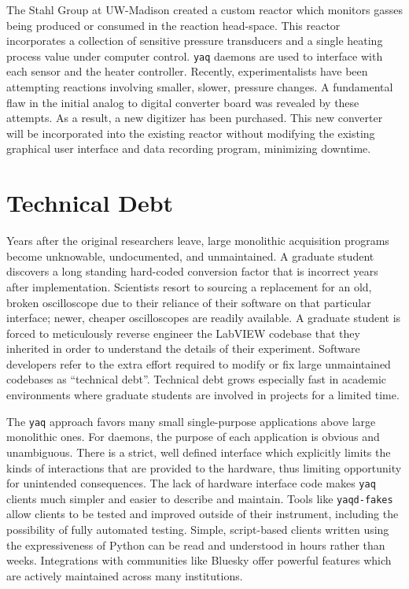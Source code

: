 \documentclass[aip, amsmath, amssymb, reprint,]{revtex4-1}
\newcommand\yaq{\texttt{yaq}}
\begin{document}
The Stahl Group at UW-Madison created a custom reactor which monitors gasses being produced or consumed in the reaction head-space.  \cite{SalazarChaseA2021a}
This reactor incorporates a collection of sensitive pressure transducers and a single heating process value under computer control.
\yaq{} daemons are used to interface with each sensor and the heater controller.
Recently, experimentalists have been attempting reactions involving smaller, slower, pressure changes.
A fundamental flaw in the initial analog to digital converter board was revealed by these attempts.
As a result, a new digitizer has been purchased.
This new converter will be incorporated into the existing reactor without modifying the existing graphical user interface and data recording program, minimizing downtime.


\section{Technical Debt}

Years after the original researchers leave, large monolithic acquisition programs become unknowable, undocumented, and unmaintained.
A graduate student discovers a long standing hard-coded conversion factor that is incorrect years after implementation.
Scientists resort to sourcing a replacement for an old, broken oscilloscope due to their reliance of their software on that particular interface; newer, cheaper oscilloscopes are readily available.
A graduate student is forced to meticulously reverse engineer the LabVIEW codebase that they inherited in order to understand the details of their experiment.
Software developers refer to the extra effort required to modify or fix large unmaintained codebases as ``technical debt''.\cite{}
Technical debt grows especially fast in academic environments where graduate students are involved in projects for a limited time.

The \yaq{} approach favors many small single-purpose applications above large monolithic ones.
For daemons, the purpose of each application is obvious and unambiguous. 
There is a strict, well defined interface which explicitly limits the kinds of interactions that are provided to the hardware, thus limiting opportunity for unintended consequences.
The lack of hardware interface code makes \yaq{} clients much simpler and easier to describe and maintain.
Tools like \texttt{yaqd-fakes}\cite{yaqd-fakes} allow clients to be tested and improved outside of their instrument, including the possibility of fully automated testing.
Simple, script-based clients written using the expressiveness of Python can be read and understood in hours rather than weeks.
Integrations with communities like Bluesky offer powerful features which are actively maintained across many institutions.
\end{document}
